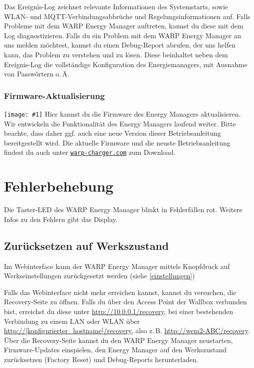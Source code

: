\documentclass[a4paper,10pt]{article}
\newcommand{\gfx}[1]{\texttt{[image: \#1]}}
\newcommand\rurl[2]{%
  \href{#1}{\nolinkurl{#2}}%
}
\begin{document}
\begin{multicols*}{2}
	Das Ereignis-Log zeichnet relevante Informationen des Systemstarts, sowie WLAN- und MQTT-Verbindungsabbrüche und Regelungsinformationen auf.
	Falls Probleme mit dem WARP Energy Manager auftreten, kannst du diese mit dem Log diagnostizieren.
	Falls du ein Problem mit dem WARP Energy Manager an uns melden möchtest, kannst du einen Debug-Report abrufen,
	der uns helfen kann, das Problem zu verstehen und zu lösen. Diese beinhaltet neben dem Ereignis-Log die vollständige
	Konfiguration des Energiemanagers, mit Ausnahme von Passwörtern o.\,Ä.

	\subsubsection{Firmware-Aktualisierung}
	\label{firmware-update}
	\gfx{./img/resized/web_firmware_update}
	Hier kannst du die Firmware des Energy Managers aktualisieren.
	Wir entwickeln die Funktionalität
	des Energy Managers laufend weiter. Bitte beachte, dass daher ggf. auch eine neue
	Version dieser Betriebsanleitung bereitgestellt wird.
	Die aktuelle Firmware und die neuste Betriebsanleitung findest du auch unter
	\rurl{https://warp-charger.com}{warp-charger.com} zum Download.

	\newpage
	\section{Fehlerbehebung}
	\label{fehlerbehebung}
	Die Taster-LED des WARP Energy Manager blinkt in Fehlerfällen rot. Weitere Infos zu den Fehlern gibt das Display.
    
    \subsection{Zurücksetzen auf Werkszustand}
    \label{werkszustand}
    
    Im Webinterface kann der WARP Energy Manager mittels Knopfdruck auf Werkseinstellungen zurückgesetzt werden (siehe \ref{einstellungen})
    
    Falls das Webinterface nicht mehr erreichen kannst, kannst du versuchen, die Recovery-Seite zu öffnen.
	Falls du über den Access Point der Wallbox verbunden bist, erreichst du diese unter \url{http://10.0.0.1/recovery},
	bei einer bestehenden Verbindung zu einem LAN oder WLAN über
	\url{http://[konfigurierter_hostname]/recovery}, also z.\,B. \url{http://wem2-ABC/recovery}.
	Über die Recovery-Seite kannst du den WARP Energy Manager neustarten, Firmware-Updates einspielen,
	den Energy Manager auf den Werkszustand zurücksetzen (Factory Reset) und Debug-Reports
	herunterladen.


\end{multicols*}
\end{document}
